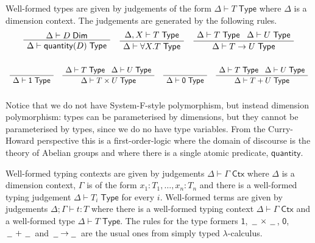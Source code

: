 \documentclass[a4paper,UKenglish]{lipics}
\theoremstyle{plain}
\newcommand{\ra}{\rightarrow}
\newcommand{\msf}[1]{\mathsf{#1}} %
\newcommand{\blank}{\, \underline{\hspace{2mm}} \,}
\newcommand{\unitTy}{\msf{1}}
\newcommand{\emptyTy}{\msf{0}}
\newcommand{\qnt}{\msf{quantity}}
\newcommand{\cj}[2]{#1 \vdash #2 \; \msf{ Ctx}}
\newcommand{\Tj}[2]{#1 \vdash #2 \; \msf{ Type}}
\newcommand{\Dj}[2]{#1 \vdash #2 \; \msf{ Dim}}
\newcommand{\tj}[4]{#1;#2 \vdash #3 : #4}
\newcommand{\Dim}{D}
\newcommand{\Dvar}{X}
\begin{document}
\vspace{3mm}  Well-formed types are given by judgements of the form $\Tj\Delta  T$ where
$\Delta$ is a dimension context. The judgements are generated by the following rules.
\[\begin{array}{c}
\AxiomC{$\Dj\Delta \Dim$}
		\UnaryInfC{$\Tj\Delta {\qnt(\Dim)}$}
		\DisplayProof

\hspace{4mm}
\AxiomC{$\Tj {\Delta, \Dvar}  T$}
	\UnaryInfC{$\Tj \Delta{ \forall \Dvar.T} $}
	\DisplayProof
\hspace{4mm}
\AxiomC{$\Delta \vdash T \; \msf{ Type} \; \; \; \Delta \vdash U \; \msf{ Type}$}
	\UnaryInfC{$\Delta \vdash T \rightarrow U  \; \msf{ Type}$}
	\DisplayProof
\\ \\
\end{array}\]
\[ \begin{array}{c}
\AxiomC{  $\phantom{\vdash T \; \msf{ Type}}$ }
		\UnaryInfC{$\Delta \vdash \unitTy \; \msf{ Type}$}
	\DisplayProof
\hspace{4mm}
\AxiomC{$\Delta \vdash T \; \msf{ Type} \; \; \; \Delta \vdash U \; \msf{ Type}$}
	\UnaryInfC{$\Delta \vdash T\times U \; \msf{ Type}$}
	\DisplayProof
\hspace{4mm}
\AxiomC{  $\phantom{ \vdash T \; \msf{ Type}}$ }
		\UnaryInfC{$\Delta \vdash \emptyTy \; \msf{ Type}$}
	\DisplayProof
\hspace{4mm}
\AxiomC{$\Delta \vdash T \; \msf{ Type} \; \; \; \Delta \vdash U \; \msf{ Type}$}
	\UnaryInfC{$\Delta \vdash T + U \; \msf{ Type}$}
	\DisplayProof
\\ \\
\end{array}\]
Notice that we do not have System-F-style polymorphism, but instead dimension polymorphism: types can be parameterised by dimensions, but they cannot be parameterised by types, since we do no have type variables. From the Curry-Howard perspective this is a first-order-logic where the domain of discourse is the theory of Abelian groups and where there is a single atomic predicate, $\qnt$.

\vspace{3mm}  Well-formed typing contexts are given by judgements
$\cj\Delta\Gamma $ where $\Delta$ is a dimension context, $\Gamma$ is
of the form ${x_1 : T_1, \ldots, x_n:T_n}$ and there is a well-formed
typing judgement $\Tj\Delta{ T_i}$ for every $i$. Well-formed terms
are given by judgements $\tj \Delta \Gamma t T$ where there is a
well-formed typing context $\cj \Delta \Gamma$ and
a well-formed type $\Tj \Delta T $. The rules for
the type formers $\unitTy$, $\blank\times\blank$, $\emptyTy$, $\blank+\blank$ and $\blank \! \ra \! \blank$ are the usual ones from
simply typed $\lambda$-calculus.
\end{document}
